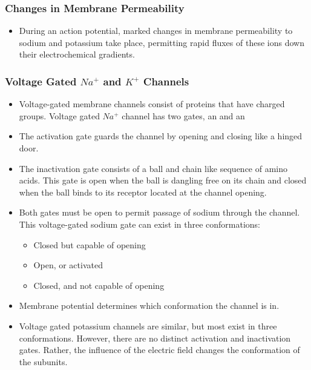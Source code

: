 \documentclass{article}
\numberwithin{equation}{section}
\begin{document}
\subsubsection{Changes in Membrane Permeability}
\begin{itemize}
    \item During an action potential, marked changes in membrane permeability to sodium and potassium take place, permitting rapid fluxes of these ions down their electrochemical gradients.
\end{itemize}
\subsubsection{Voltage Gated \texorpdfstring{$Na^+$}{Na+} and \texorpdfstring{$K^+$}{K+} Channels}
\begin{itemize}
    \item Voltage-gated membrane channels consist of proteins that have charged groups. Voltage gated $Na^+$ channel has two gates, an  and an 
    \item The activation gate guards the channel by opening and closing like a hinged door.
    \item The inactivation gate consists of a ball and chain like sequence of amino acids. This gate is open when the ball is dangling free on its chain and closed when the ball binds to its receptor located at the channel opening.
    \item Both gates must be open to permit passage of sodium through the channel. This voltage-gated sodium gate can exist in three conformations:
    \begin{itemize}
        \item Closed but capable of opening 
        \item Open, or activated
        \item Closed, and not capable of opening
    \end{itemize}
    \item Membrane potential determines which conformation the channel is in.
    \item Voltage gated potassium channels are similar, but most exist in three conformations. However, there are no distinct activation and inactivation gates. Rather, the influence of the electric field changes the conformation of the subunits.
\end{itemize}
\end{document}

